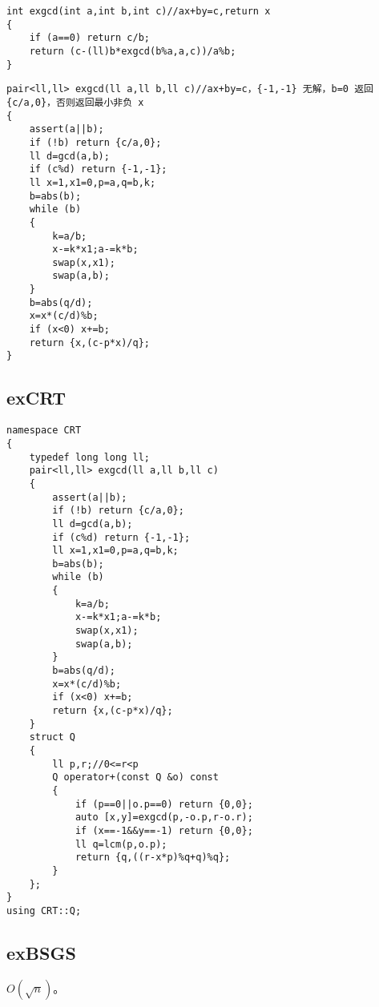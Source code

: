 \documentclass{ctexart}
\begin{document}
\begin{lstlisting}
int exgcd(int a,int b,int c)//ax+by=c,return x
{
	if (a==0) return c/b;
	return (c-(ll)b*exgcd(b%a,a,c))/a%b;
}
\end{lstlisting}

\begin{lstlisting}
pair<ll,ll> exgcd(ll a,ll b,ll c)//ax+by=c，{-1,-1} 无解，b=0 返回 {c/a,0}，否则返回最小非负 x
{
	assert(a||b);
	if (!b) return {c/a,0};
	ll d=gcd(a,b);
	if (c%d) return {-1,-1};
	ll x=1,x1=0,p=a,q=b,k;
	b=abs(b);
	while (b)
	{
		k=a/b;
		x-=k*x1;a-=k*b;
		swap(x,x1);
		swap(a,b);
	}
	b=abs(q/d);
	x=x*(c/d)%b;
	if (x<0) x+=b;
	return {x,(c-p*x)/q};
}
\end{lstlisting}

\subsection{exCRT}

\begin{lstlisting}
namespace CRT
{
	typedef long long ll;
	pair<ll,ll> exgcd(ll a,ll b,ll c)
	{
		assert(a||b);
		if (!b) return {c/a,0};
		ll d=gcd(a,b);
		if (c%d) return {-1,-1};
		ll x=1,x1=0,p=a,q=b,k;
		b=abs(b);
		while (b)
		{
			k=a/b;
			x-=k*x1;a-=k*b;
			swap(x,x1);
			swap(a,b);
		}
		b=abs(q/d);
		x=x*(c/d)%b;
		if (x<0) x+=b;
		return {x,(c-p*x)/q};
	}
	struct Q
	{
		ll p,r;//0<=r<p
		Q operator+(const Q &o) const
		{
			if (p==0||o.p==0) return {0,0};
			auto [x,y]=exgcd(p,-o.p,r-o.r);
			if (x==-1&&y==-1) return {0,0};
			ll q=lcm(p,o.p);
			return {q,((r-x*p)%q+q)%q};
		}
	};
}
using CRT::Q;
\end{lstlisting}


\subsection{exBSGS}

$O(\sqrt n)$。
\end{document}
